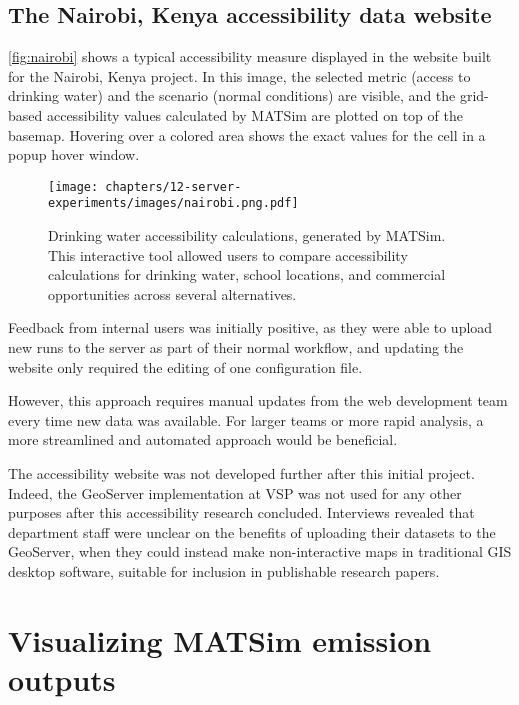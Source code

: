 \hypertarget{server-experiments-geoserver-3}{%
\subsection{The Nairobi, Kenya accessibility data website}
\label{server-experiments-geoserver-3}}

\autoref{fig:nairobi} shows a typical accessibility measure displayed in the website built for the Nairobi, Kenya project. In this image, the selected metric (access to drinking water) and the scenario (normal conditions) are visible, and the grid-based accessibility values calculated by MATSim are plotted on top of the basemap. Hovering over a colored area shows the exact values for the cell in a popup hover window.

\begin{figure}[!ht]
  \texttt{[image: chapters/12-server-experiments/images/nairobi.png.pdf]}
  \caption[Drinking water accessibility calculations, generated by MATSim]{Drinking water accessibility calculations, generated by MATSim. This interactive tool allowed users to compare accessibility calculations for drinking water, school locations, and commercial opportunities across several alternatives.}
  \label{fig:nairobi}
\end{figure}

Feedback from internal users was initially positive, as they were able to upload new runs to the server as part of their normal workflow, and updating the website only required the editing of one configuration file.

However, this approach requires manual updates from the web development team every time new data was available. For larger teams or more rapid analysis, a more streamlined and automated approach would be beneficial.

The accessibility website was not developed further after this initial project. Indeed, the GeoServer implementation at VSP was not used for any other purposes after this accessibility research concluded. Interviews revealed that department staff were unclear on the benefits of uploading their datasets to the GeoServer, when they could instead make non-interactive maps in traditional GIS desktop software, suitable for inclusion in publishable research papers.

\hypertarget{server-experiments-emissions}{%
\section{Visualizing MATSim emission outputs}
\label{server-experiments-emissions}}

